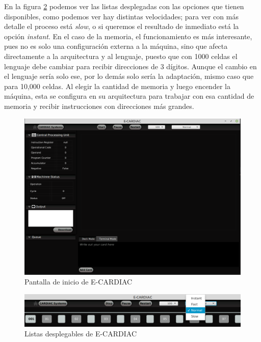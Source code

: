 \documentclass[letterpaper,12pt,oneside]{book}
\begin{document}
    En la figura \ref{fig:listasDespCardiac}
	podemos ver las listas desplegadas con las opciones que tienen disponibles, como podemos ver hay distintas velocidades; para ver con más detalle el proceso
	está \textit{slow}, o si queremos el resultado de inmediato está la opción \textit{instant}. En el caso de la memoria, el funcionamiento es más interesante, pues
	no es solo una configuración externa a la máquina, sino que afecta directamente a la arquitectura y al lenguaje, puesto que con 1000 celdas el lenguaje
	debe cambiar para recibir direcciones de 3 dígitos. Aunque el cambio en el lenguaje sería solo ese, por lo demás solo sería la adaptación, mismo
	caso que para 10,000 celdas. Al elegir la cantidad de memoria y luego encender la máquina, esta se configura en su arquitectura para trabajar con esa
	cantidad de memoria y recibir instrucciones con direcciones más grandes.

	\begin{figure}[h]
 			\centering
			\includegraphics[scale=0.4]{media/ECARDIAC/ECARDIAC_P1.png}
			\caption{Pantalla de inicio de E-CARDIAC}
			\label{fig:iniECardiac}
	\end{figure}


	\begin{figure}[H]
 			\centering
			\includegraphics[scale=0.45]{media/ECARDIAC/ecardiac_lista_velocidad.png}
			\caption{Listas desplegables de E-CARDIAC}
			\label{fig:listasDespCardiac}
	\end{figure}
\end{document}
